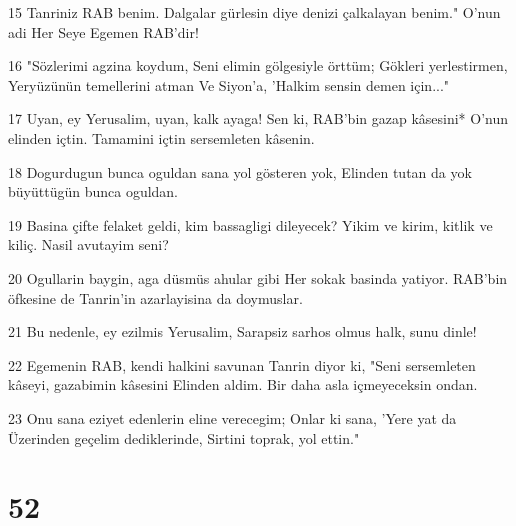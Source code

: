 \par 15 Tanriniz RAB benim. Dalgalar gürlesin diye denizi çalkalayan benim." O'nun adi Her Seye Egemen RAB'dir!
\par 16 "Sözlerimi agzina koydum, Seni elimin gölgesiyle örttüm; Gökleri yerlestirmen, Yeryüzünün temellerini atman Ve Siyon'a, 'Halkim sensin demen için..."
\par 17 Uyan, ey Yerusalim, uyan, kalk ayaga! Sen ki, RAB'bin gazap kâsesini* O'nun elinden içtin. Tamamini içtin sersemleten kâsenin.
\par 18 Dogurdugun bunca oguldan sana yol gösteren yok, Elinden tutan da yok büyüttügün bunca oguldan.
\par 19 Basina çifte felaket geldi, kim bassagligi dileyecek? Yikim ve kirim, kitlik ve kiliç. Nasil avutayim seni?
\par 20 Ogullarin baygin, aga düsmüs ahular gibi Her sokak basinda yatiyor. RAB'bin öfkesine de Tanrin'in azarlayisina da doymuslar.
\par 21 Bu nedenle, ey ezilmis Yerusalim, Sarapsiz sarhos olmus halk, sunu dinle!
\par 22 Egemenin RAB, kendi halkini savunan Tanrin diyor ki, "Seni sersemleten kâseyi, gazabimin kâsesini Elinden aldim. Bir daha asla içmeyeceksin ondan.
\par 23 Onu sana eziyet edenlerin eline verecegim; Onlar ki sana, 'Yere yat da Üzerinden geçelim dediklerinde, Sirtini toprak, yol ettin."

\chapter{52}

